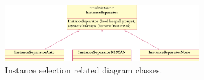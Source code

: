 \begin{figure}
  \centering
  \includegraphics[width=0.75\textwidth]{figures/user-guide/tool-design-interpolate-instance-separator.pdf}
  \caption{Instance selection related diagram classes.}
  \label{fig:tool_design_interpolate_instance_separator}
\end{figure}
